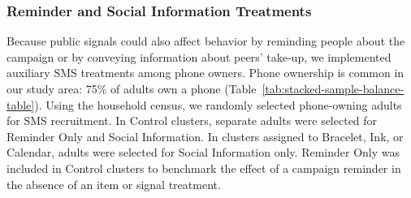 \documentclass[ECM\space ReStud.tex]{subfiles}
\begin{document}

\subsubsection{Reminder and Social Information Treatments}

Because public signals could also affect behavior by reminding people about the campaign or by conveying information about peers' take-up, we implemented auxiliary SMS treatments among phone owners. Phone ownership is common in our study area: 75\% of adults own a phone (Table~\ref{tab:stacked-sample-balance-table}). Using the household census, we randomly selected phone-owning adults for SMS recruitment. In Control clusters, separate adults were selected for Reminder Only and Social Information. In clusters assigned to Bracelet, Ink, or Calendar, adults were selected for Social Information only. Reminder Only was included in Control clusters to benchmark the effect of a campaign reminder in the absence of an item or signal treatment.
\end{document}
